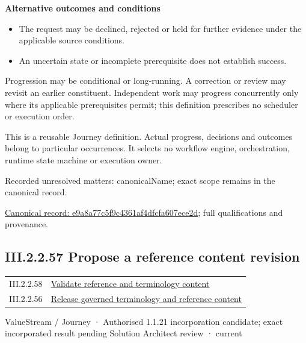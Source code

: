 \par\medskip\textbf{Alternative outcomes and conditions}\par


\begin{itemize}


\item The request may be declined, rejected or held for further evidence under the applicable source conditions.

\item An uncertain state or incomplete prerequisite does not establish success.

\end{itemize}


Progression may be conditional or long-running. A correction or review may revisit an earlier constituent. Independent work may progress concurrently only where its applicable prerequisites permit; this definition prescribes no scheduler or execution order.



This is a reusable Journey definition. Actual progress, decisions and outcomes belong to particular occurrences. It selects no workflow engine, orchestration, runtime state machine or execution owner.


{\small Recorded unresolved matters: canonicalName; exact scope remains in the canonical record.}\par
{\footnotesize \href{../../../../../../../continuum/strategy/value-stream/e9a8a77c5f9c4361af4dfcfa607ece2d.md}{Canonical record: e9a8a77c5f9c4361af4dfcfa607ece2d}; full qualifications and provenance.}\par
\subsection*{III.2.2.57 Propose a reference content revision}
\label{navigation:III.2.2.57}

\begin{longtable}{p{.22\linewidth}p{.73\linewidth}}
III.2.2.58 & \hyperref[element:6e6c29788acd49ab87f918476d7a3de0]{Validate reference and terminology content} \\
III.2.2.56 & \hyperref[element:e9a8a77c5f9c4361af4dfcfa607ece2d]{Release governed terminology and reference content} \\
\end{longtable}
\label{element:60f86772914349b086fec14a06ebf30b}
{\small ValueStream / Journey · Authorised 1.1.21 incorporation candidate; exact incorporated result pending Solution Architect review · current}\par

